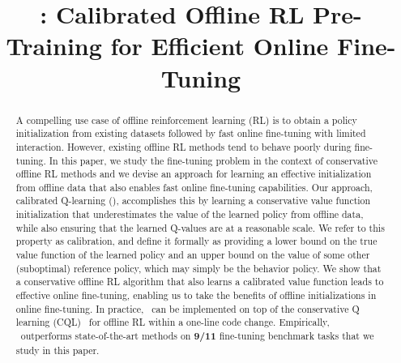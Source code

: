 \documentclass{article}
\title{\methodname: Calibrated Offline RL Pre-Training for Efficient Online Fine-Tuning}
\begin{document}
\maketitle


\begin{abstract}
A compelling use case of offline reinforcement learning (RL) is to obtain a policy initialization from existing datasets followed by fast online fine-tuning with limited interaction. However, existing offline RL methods tend to behave poorly during fine-tuning. In this paper, we study the fine-tuning problem in the context of conservative offline RL methods and we devise an approach for learning an effective initialization from offline data that also enables fast online fine-tuning capabilities. Our approach, calibrated Q-learning (\methodname), accomplishes this by learning a conservative value function initialization that underestimates the value of the learned policy from offline data, while also ensuring that the learned Q-values are at a reasonable scale. We refer to this property as calibration, and define it formally as providing a lower bound on the true value function of the learned policy and an upper bound on the value of some other (suboptimal) reference policy, which may simply be the behavior policy. We show that a conservative offline RL algorithm that also learns a calibrated value function leads to effective online fine-tuning, enabling us to take the benefits of offline initializations in online fine-tuning. In practice, \methodname\ can be implemented on top of the conservative Q learning (CQL)~\cite{kumar2020conservative} for offline RL within a one-line code change. Empirically, \methodname\ outperforms state-of-the-art methods on {\bf 9/11} fine-tuning benchmark tasks that we study in this paper.     

\end{abstract}












\appendix

\end{document}
